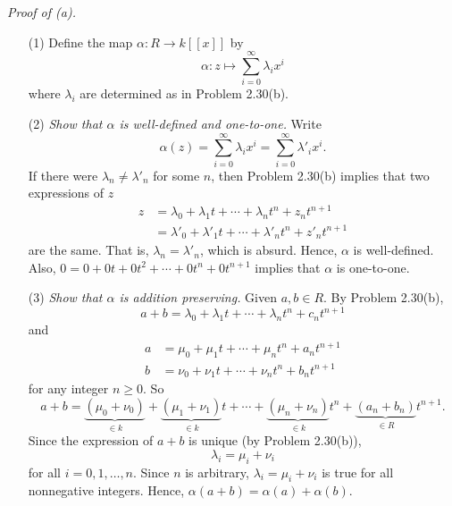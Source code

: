 \documentclass{article}
\begin{document}
\emph{Proof of (a).}
\begin{enumerate}
\item[(1)]
  Define the map $\alpha: R \to k[[x]]$ by
  \[
    \alpha: z \mapsto \sum_{i=0}^{\infty} \lambda_i x^i
  \]
  where $\lambda_i$ are determined as in Problem 2.30(b).

\item[(2)]
  \emph{Show that $\alpha$ is well-defined and one-to-one.}
  Write
  \[
    \alpha(z)
    = \sum_{i=0}^{\infty} \lambda_i x^i
    = \sum_{i=0}^{\infty} \lambda'_i x^i.
  \]
  If there were $\lambda_n \neq \lambda'_n$ for some $n$,
  then Problem 2.30(b) implies that two expressions of $z$
  \begin{align*}
    z
    &= \lambda_0 + \lambda_1 t + \cdots + \lambda_n t^n + z_n t^{n+1} \\
    &= \lambda'_0 + \lambda'_1 t + \cdots + \lambda'_n t^n + z'_n t^{n+1}
  \end{align*}
  are the same. That is, $\lambda_n = \lambda'_n$, which is absurd.
  Hence, $\alpha$ is well-defined.
  Also,
  $0 = 0 + 0 t + 0 t^2 + \cdots + 0 t^n + 0 t^{n+1}$
  implies that $\alpha$ is one-to-one.

\item[(3)]
  \emph{Show that $\alpha$ is addition preserving.}
  Given $a, b \in R$. By Problem 2.30(b),
  \[
    a+b
    = \lambda_0 + \lambda_1 t + \cdots + \lambda_n t^n + c_n t^{n+1}
  \]
  and
  \begin{align*}
    a
    &= \mu_0 + \mu_1 t + \cdots + \mu_n t^n + a_n t^{n+1} \\
    b
    &= \nu_0 + \nu_1 t + \cdots + \nu_n t^n + b_n t^{n+1}
  \end{align*}
  for any integer $n \geq 0$.
  So
  \[
    a+b
    = \underbrace{(\mu_0+\nu_0)}_{\in k}
      + \underbrace{(\mu_1+\nu_1)}_{\in k} t + \cdots
      + \underbrace{(\mu_n+\nu_n)}_{\in k} t^n
      + \underbrace{(a_n+b_n)}_{\in R} t^{n+1}.
  \]
  Since the expression of $a+b$ is unique (by Problem 2.30(b)),
  \[
    \lambda_i = \mu_i + \nu_i
  \]
  for all $i = 0, 1, \ldots, n$.
  Since $n$ is arbitrary, $\lambda_i = \mu_i + \nu_i$ is true for all nonnegative integers.
  Hence, $\alpha(a+b) = \alpha(a) + \alpha(b)$.


\end{enumerate}
\end{document}
